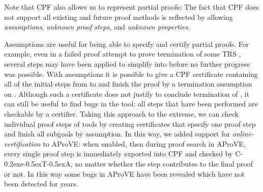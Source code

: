 \documentclass[USenglish]{eptcs}
\newcommand\aprove{\textsf{AProVE}\xspace}
\newcommand\ceta{\textsf{C\kern-0.2exe\kern-0.5exT\kern-0.5exA}\xspace}
\begin{document}
Note that CPF also allows us to represent partial proofs:
The fact that CPF does not support all existing and future
proof methods is reflected by allowing \emph{assumptions}, \emph{unknown proof steps}, and 
\emph{unknown properties}.

Assumptions are useful for being able to specify and certify partial proofs.
For example, even in a failed proof attempt to prove termination of some TRS
, several steps may have been applied to simplify  into  before
no further progress was possible.  With assumptions it is possible to give a
CPF certificate containing all of the initial steps from  to  and
finish the proof by a termination assumption on .  Although such a
certificate does not justify to conclude termination of , it can still be
useful to find bugs in the tool: all steps that have been performed are
checkable by a certifier.
Taking this approach to the extreme, we can check individual proof steps of tools by
creating certificates that specify one proof step and finish all subgoals by assumption.
In this way, we added support for \emph{online-certification} to \aprove: when
enabled, then during proof search in \aprove, every single proof step is immediately exported 
into CPF and checked by \ceta, no matter whether the step contributes to the final proof or not.
In this way some bugs in \aprove have been revealed which have not been detected for years.
\end{document}

